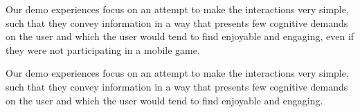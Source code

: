 \documentclass{chi-ext}
\begin{document}
Our demo experiences focus on an attempt to make the interactions very simple, such that they convey information in a way that presents few cognitive demands on the user and which the user would tend to find enjoyable and engaging, even if they were not participating in a mobile game. 




Our demo experiences focus on an attempt to make the interactions very simple, such that they convey information in a way that presents few cognitive demands on the user and which the user would tend to find enjoyable and engaging.

\end{document}
